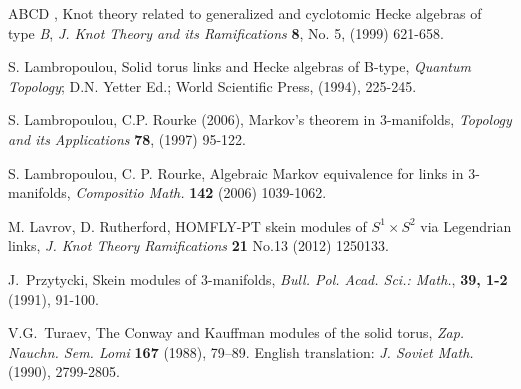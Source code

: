 \documentclass[11pt]{amsart}
\begin{document}
\begin{thebibliography}{ABCD}
, Knot theory related to generalized and cyclotomic Hecke algebras of type {\it B}, {\it J. Knot Theory and its Ramifications} {\bf 8}, No. 5, (1999) 621-658.

 {\sc S. Lambropoulou}, Solid torus links and Hecke algebras of B-type, {\it Quantum Topology}; D.N. Yetter Ed.; World Scientific Press, (1994), 225-245.

 {\sc S. Lambropoulou, C.P. Rourke} (2006), Markov's theorem in $3$-manifolds, \emph{Topology and its Applications} {\bf 78},
(1997) 95-122.

 {\sc S. Lambropoulou, C. P. Rourke}, Algebraic Markov equivalence for links in $3$-manifolds, {\em Compositio Math.} {\bf 142} (2006) 1039-1062.

 {\sc M. Lavrov, D. Rutherford}, HOMFLY-PT skein modules of $S^1 \times S^2$ via Legendrian links, {\em J. Knot Theory Ramifications} {\bf 21} No.13 (2012) 1250133.

 {\sc J.~Przytycki}, Skein modules of 3-manifolds, {\it Bull. Pol. Acad. Sci.: Math.}, {\bf 39, 1-2} (1991), 91-100.

 {\sc V.G.~Turaev}, The Conway and Kauffman modules of the solid torus,  {\it Zap. Nauchn. Sem. Lomi} {\bf 167} (1988), 79--89. English translation: {\it J. Soviet Math.} (1990), 2799-2805.

\end{thebibliography}
\end{document}
